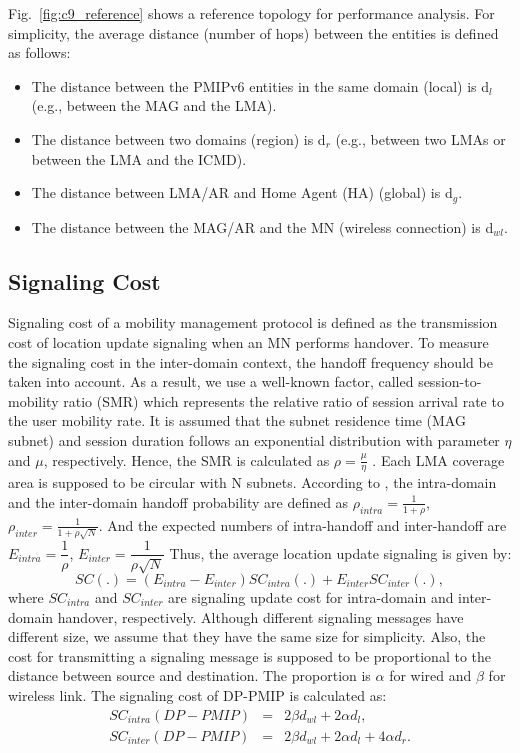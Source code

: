 Fig.~\ref{fig:c9_reference} shows a reference topology for performance analysis. For simplicity, the average distance (number of hops) between the entities is defined as follows:
\begin{itemize}
\item The distance between the PMIPv6 entities in the same domain (local) is d$_{l}$ (e.g., between the MAG and the LMA). 
\item The distance between two domains (region) is d$_{r}$ (e.g., between two LMAs or between the LMA and the ICMD).
\item The distance between LMA/AR and Home Agent (HA) (global) is d$_{g}$.  
\item The distance between the MAG/AR and the MN (wireless connection) is d$_{wl}$.
\end{itemize}

\subsection{Signaling Cost}
Signaling cost of a mobility management protocol is defined as the transmission cost of location update signaling when an MN performs handover. To measure the signaling cost in the inter-domain context, the handoff frequency should be taken into account. As a result, we use a well-known factor, called session-to-mobility ratio (SMR) which represents the relative ratio of session arrival rate to the user mobility rate.
It is assumed that the subnet residence time (MAG subnet) and session duration follows an exponential distribution with parameter $\eta$ and $\mu$, respectively. Hence, the SMR is calculated as $\rho=\frac{\mu}{\eta}$ \cite{prob}. 
Each LMA coverage area is supposed to be circular with N subnets. According to \cite{HO_comparison_Makaya}, the intra-domain and the inter-domain handoff probability are defined as $\rho_{intra}=\frac{1}{1+\rho}$,  $\rho_{inter}=\frac{1}{1+\rho \sqrt{N}}$. And the expected numbers of intra-handoff and inter-handoff are $E_{intra}=\dfrac{1}{\rho}$, $E_{inter}=\dfrac{1}{\rho \sqrt{N}}$
Thus, the average location update signaling is given by:\\
\begin{equation}
SC(.) = \left( E_{intra} - E_{inter}\right) SC_{intra} (.) + E_{inter} SC_{inter}(.),
\end{equation}
where $SC_{intra}$ and $SC_{inter}$ are signaling update cost for intra-domain and inter-domain handover, respectively. 
Although different signaling messages have different size, we assume that they have the same size for simplicity. Also, the cost for transmitting a signaling message is supposed to be proportional to the distance between source and destination. The proportion is $\alpha$ for wired and $\beta$ for wireless link. The signaling cost of DP-PMIP is calculated as: 
\setlength{\arraycolsep}{0.0em}
\begin{eqnarray}
SC_{intra} (DP-PMIP)&{}  ={}& 2 \beta d_{wl} + 2\alpha d_{l},\\
SC_{inter}(DP-PMIP)&{}  ={}&  2 \beta d_{wl} + 2\alpha d_{l} +4\alpha d_{r}. 
\end{eqnarray}

